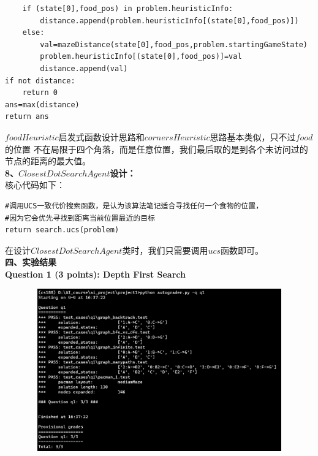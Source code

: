 \documentclass[a4paper,12pt,UTF8]{article}
\begin{document}
\begin{flushleft}
{{\begin{lstlisting}
    if (state[0],food_pos) in problem.heuristicInfo:
        distance.append(problem.heuristicInfo[(state[0],food_pos)])
    else:
        val=mazeDistance(state[0],food_pos,problem.startingGameState)
        problem.heuristicInfo[(state[0],food_pos)]=val
        distance.append(val)
if not distance:
    return 0
ans=max(distance)
return ans
        \end{lstlisting}
    }
    \normalsize{
        \hspace{1cm}$foodHeuristic$启发式函数设计思路和$cornersHeuristic$思路基本类似，只不过$food$的位置
        不在局限于四个角落，而是任意位置，我们最后取的是到各个未访问过的节点的距离的最大值。\\
    }
    \large{
        \hspace{1cm}\textbf{8、$ClosestDotSearchAgent$设计：\\}
    }
    \normalsize{
        \hspace{1cm}核心代码如下：\\
    }
    \scriptsize{
        \begin{lstlisting}
#调用UCS一致代价搜索函数，是认为该算法笔记适合寻找任何一个食物的位置，
#因为它会优先寻找到距离当前位置最近的目标
return search.ucs(problem)          
        \end{lstlisting}
    }
    \normalsize{
        \hspace{1cm}在设计$ClosestDotSearchAgent$类时，我们只需要调用$ucs$函数即可。\\
    }
    \Large{
        \textbf{
            四、实验结果\\
        }
    }
    \large{
        \hspace{1cm}\textbf{
            Question 1 (3 points): Depth First Search\\
        }
    }
    \begin{figure}[h]
        \centering
        \includegraphics[width=12cm,height=7cm]{1.png}
    \end{figure}

}
\end{flushleft}
\end{document}
